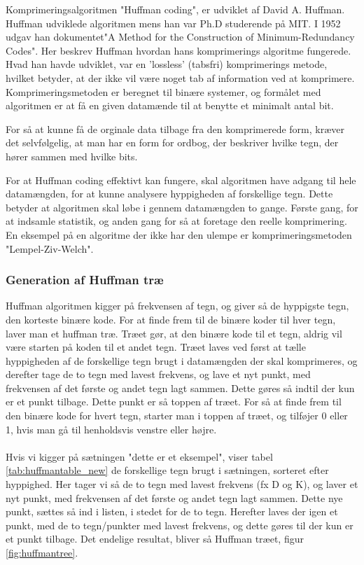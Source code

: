 Komprimeringsalgoritmen "Huffman coding", er udviklet af David A. Huffman. Huffman udviklede algoritmen mens han var Ph.D studerende på MIT. I 1952 udgav han dokumentet"A Method for the Construction of Minimum-Redundancy Codes"\cite{A_Method_for}. Her beskrev Huffman hvordan hans komprimerings algoritme fungerede. Hvad han havde udviklet, var en 'lossless' (tabsfri) komprimerings metode, hvilket betyder, at der ikke vil være noget tab af information ved at komprimere. Komprimeringsmetoden er beregnet til binære systemer, og formålet med algoritmen er at få en given datamænde til at benytte et minimalt antal bit. 

For så at kunne få de orginale data tilbage fra den komprimerede form, kræver det selvfølgelig, at man har en form for ordbog, der beskriver hvilke tegn, der hører sammen med hvilke bits.

For at Huffman coding effektivt kan fungere, skal algoritmen have adgang til hele datamængden, for at kunne analysere hyppigheden af forskellige tegn. Dette betyder at algoritmen skal løbe i gennem datamængden to gange. Første gang, for at indsamle statistik, og anden gang for så at foretage den reelle komprimering. En eksempel på en algoritme der ikke har den ulempe er komprimeringsmetoden "Lempel-Ziv-Welch".


\subsubsection{Generation af Huffman træ}
Huffman algoritmen kigger på frekvensen af tegn, og giver så de hyppigste tegn, den korteste binære kode. For at finde frem til de binære koder til hver tegn, laver man et huffman træ. Træet gør, at den binære kode til et tegn, aldrig vil være starten på koden til et andet tegn. Træet laves ved først at tælle hyppigheden af de forskellige tegn brugt i datamængden der skal komprimeres, og derefter tage de to tegn med lavest frekvens, og lave et nyt punkt, med frekvensen af det første og andet tegn lagt sammen. Dette gøres så indtil der kun er et punkt tilbage. Dette punkt er så toppen af træet. For så at finde frem til den binære kode for hvert tegn, starter man i toppen af træet, og tilføjer 0 eller 1, hvis man gå til henholdsvis venstre eller højre.
\\
\\
Hvis vi kigger på sætningen "dette er et eksempel", viser tabel \ref{tab:huffmantable_new} de forskellige tegn brugt i sætningen, sorteret efter hyppighed. Her tager vi så de to tegn med lavest frekvens (fx D og K), og laver et nyt punkt, med frekvensen af det første og andet tegn lagt sammen. Dette nye punkt, sættes så ind i listen, i stedet for de to tegn. Herefter laves der igen et punkt, med de to tegn/punkter med lavest frekvens, og dette gøres til der kun er et punkt tilbage. Det endelige resultat, bliver så Huffman træet, figur \ref{fig:huffmantree}. 




